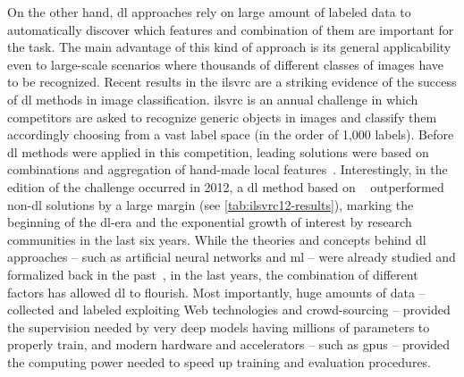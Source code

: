On the other hand, \acrlong{dl} approaches rely on large amount of labeled data to automatically discover which features and combination of them are important for the task.
The main advantage of this kind of approach is its general applicability even to large-scale scenarios where thousands of different classes of images have to be recognized.
Recent results in the \gls{ilsvrc} are a striking evidence of the success of \gls{dl} methods in image classification.
\gls{ilsvrc} is an annual challenge in which competitors are asked to recognize generic objects in images and classify them accordingly choosing from a vast label space (in the order of 1,000 labels).
Before \gls{dl} methods were applied in this competition, leading solutions were based on combinations and aggregation of hand-made local features~\cite{}.
Interestingly, in the edition of the challenge occurred in 2012, a \gls{dl} method based on ~\cite{} outperformed non-\gls{dl} solutions by a large margin (see \ref{tab:ilsvrc12-results}), marking the beginning of the \gls{dl}-era
and the exponential growth of interest by research communities in the last six years.
While the theories and concepts behind \gls{dl} approaches -- such as artificial neural networks and \acrlong{ml} -- were already studied and formalized back in the past~\cite{}, in the last years, the combination of different factors has allowed \acrlong{dl} to flourish.
Most importantly, huge amounts of data -- collected and labeled exploiting Web technologies and crowd-sourcing -- provided the supervision needed by very deep models having millions of parameters to properly train, and modern hardware and accelerators -- such as \glspl{gpu} -- provided the computing power needed to speed up training and evaluation procedures.

